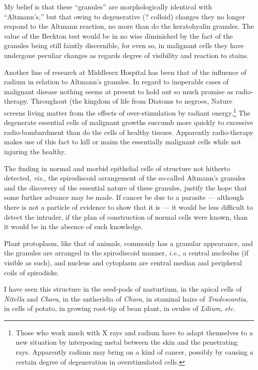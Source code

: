 \documentclass[a4paper, 12pt, oneside]{article}
\begin{document}
My belief is that these ``granules'' are morphologically identical with ``Altmann's,'' but that owing to degenerative (? colloid) changes they no longer respond to the Altmann reaction, no more than do the keratohyalin granules. The value of the Beckton test would be in no wise diminished by the fact of the granules being still faintly discernible, for even so, in malignant cells they have undergone peculiar changes as regards degree of visibility and reaction to stains.

Another line of research at Middlesex Hospital has been that of the influence of radium in relation to Altmann's granules. In regard to inoperable cases of malignant disease nothing seems at present to hold out so much promise as radio-therapy. Throughout (the kingdom of life from Diatoms to negroes, Nature screens living matter from the effects of over-stimulation by radiant energy.\footnote{Those who work much with X rays and radium have to adapt themselves to a new situation by interposing metal between the skin and the penetrating rays. Apparently radium may bring on a kind of cancer, possibly by causing a certain degree of degeneration in overstimulated cells.} The degenerate essential cells of malignant growths succumb more quickly to excessive radio-bombardment than do the cells of healthy tissues. Apparently radio-therapy makes use of this fact to kill or maim the essentially malignant cells while not injuring the healthy.

The finding in normal and morbid epithelial cells of structure not hitherto detected, \emph{viz.}, the spirodiscoid arrangement of the so-called Altmann's granules and the discovery of the essential nature of these granules, justify the hope that some further advance may be made. If cancer be due to a parasite --- although there is not a particle of evidence to show that it is --- it would be less difficult to detect the intruder, if the plan of construction of normal cells were known, than it would be in the absence of such knowledge.

Plant protoplasm, like that of animals, commonly has a granular appearance, and the granules are arranged in the spirodiscoid manner, \emph{i.e.}, a central nucleolus (if visible as such), and nucleus and cytoplasm are central median and peripheral coils of spirodisks.

I have seen this structure in the seed-pods of nasturtium, in the apical cells of \emph{Nitella} and \emph{Chara}, in the antheridia of \emph{Chara}, in staminal hairs of \emph{Tradescantia}, in cells of potato, in growing root-tip of bean plant, in ovules of \emph{Lilium}, \emph{etc.}
\end{document}
